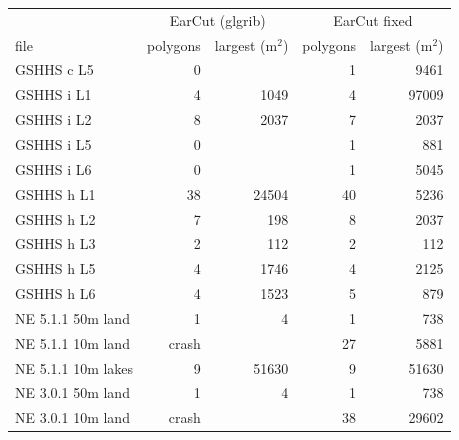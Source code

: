 \begin{tabular}{lrrrr}
\toprule
 & \multicolumn{2}{c}{EarCut (glgrib)} & \multicolumn{2}{c}{EarCut fixed} \\
file & polygons & largest (m$^2$) & polygons & largest (m$^2$) \\
\midrule
GSHHS c L5 & 0 &  & 1 & 9461 \\
GSHHS i L1 & 4 & 1049 & 4 & 97009 \\
GSHHS i L2 & 8 & 2037 & 7 & 2037 \\
GSHHS i L5 & 0 &  & 1 & 881 \\
GSHHS i L6 & 0 &  & 1 & 5045 \\
GSHHS h L1 & 38 & 24504 & 40 & 5236 \\
GSHHS h L2 & 7 & 198 & 8 & 2037 \\
GSHHS h L3 & 2 & 112 & 2 & 112 \\
GSHHS h L5 & 4 & 1746 & 4 & 2125 \\
GSHHS h L6 & 4 & 1523 & 5 & 879 \\
NE 5.1.1 50m land & 1 & 4 & 1 & 738 \\
NE 5.1.1 10m land & crash &  & 27 & 5881 \\
NE 5.1.1 10m lakes & 9 & 51630 & 9 & 51630 \\
NE 3.0.1 50m land & 1 & 4 & 1 & 738 \\
NE 3.0.1 10m land & crash &  & 38 & 29602 \\
\bottomrule
\end{tabular}

